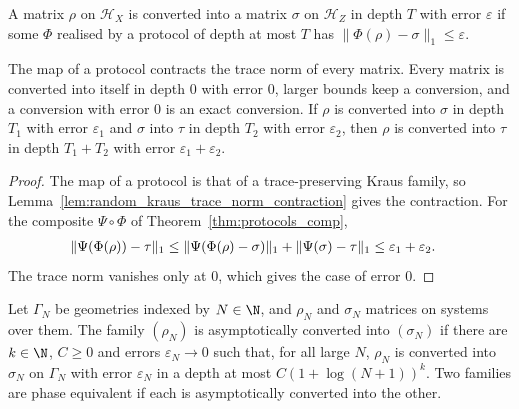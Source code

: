 \begin{definition}
    \label{def:protocols_approx_conversion}
    \leanok
    A matrix $\rho$ on $\mathcal H_X$ is converted into a matrix $\sigma$ on $\mathcal H_Z$ in
    depth $T$ with error $\varepsilon$ if some $\Phi$ realised by a protocol of depth at most
    $T$ has $\lVert\Phi(\rho)-\sigma\rVert_1\le\varepsilon$.
\end{definition}

\begin{theorem}
    \label{thm:protocols_approx_comp}
    \leanok
    The map of a protocol contracts the trace norm of every matrix. Every matrix is converted
    into itself in depth $0$ with error $0$, larger bounds keep a conversion, and a
    conversion with error $0$ is an exact conversion. If $\rho$ is converted into $\sigma$ in
    depth $T_1$ with error $\varepsilon_1$ and $\sigma$ into $\tau$ in depth $T_2$ with error
    $\varepsilon_2$, then $\rho$ is converted into $\tau$ in depth $T_1+T_2$ with error
    $\varepsilon_1+\varepsilon_2$.
\end{theorem}
\begin{proof}\leanok
    The map of a protocol is that of a trace-preserving Kraus family, so
    Lemma~\ref{lem:random_kraus_trace_norm_contraction} gives the contraction. For the
    composite $\Psi\circ\Phi$ of Theorem~\ref{thm:protocols_comp},
    \begin{align}
        \lVert\Psi(\Phi(\rho))-\tau\rVert_1
        &\le\lVert\Psi(\Phi(\rho)-\sigma)\rVert_1+\lVert\Psi(\sigma)-\tau\rVert_1
        \le\varepsilon_1+\varepsilon_2.
        \notag
    \end{align}
    The trace norm vanishes only at $0$, which gives the case of error $0$.
\end{proof}

\begin{definition}
    \label{def:protocols_asymptotic}
    \leanok
    Let $\Gamma_N$ be geometries indexed by $N\in\N$, and $\rho_N$ and $\sigma_N$ matrices on
    systems over them. The family $(\rho_N)$ is asymptotically converted into $(\sigma_N)$ if
    there are $k\in\N$, $C\ge0$ and errors $\varepsilon_N\to0$ such that, for all large $N$,
    $\rho_N$ is converted into $\sigma_N$ on $\Gamma_N$ with error $\varepsilon_N$ in a depth
    at most $C(1+\log(N+1))^k$. Two families are phase equivalent if each is asymptotically
    converted into the other.
\end{definition}


